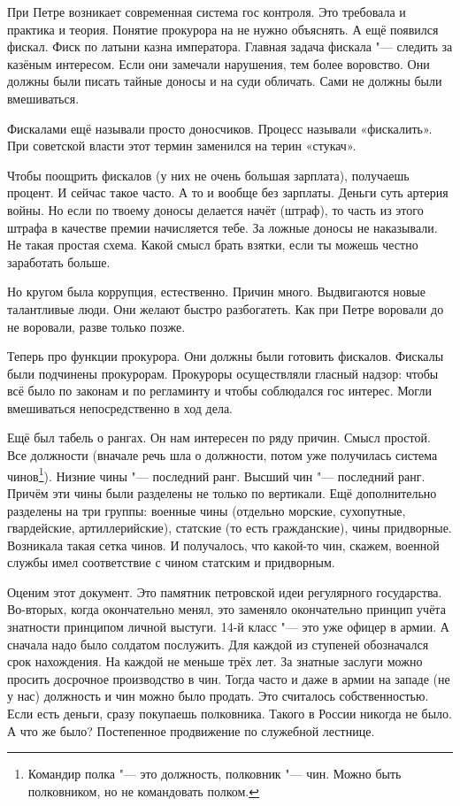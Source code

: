При Петре возникает современная система гос контроля. Это требовала и практика и теория. Понятие прокурора на не нужно объяснять. А ещё появился фискал. Фиск по латыни казна императора. Главная задача фискала "--- следить за казёным интересом. Если они замечали нарушения, тем более воровство. Они должны были писать тайные доносы и на суди обличать. Сами не должны были вмешиваться. 

Фискалами ещё называли просто доносчиков. Процесс называли «фискалить». При советской власти этот термин заменился на терин «стукач».

Чтобы поощрить фискалов (у них не очень большая зарплата), получаешь процент. И сейчас такое часто. А то и вообще без зарплаты. Деньги суть артерия войны. Но если по твоему доносы делается начёт (штраф), то часть из этого штрафа в качестве премии начисляется тебе. За ложные доносы не наказывали.
Не такая простая схема. Какой смысл брать взятки, если ты можешь честно заработать больше. 

Но кругом была коррупция, естественно. Причин много. Выдвигаются новые талантливые люди. Они желают быстро разбогатеть. Как при Петре воровали до не воровали, разве только позже.

Теперь про функции прокурора. Они должны были готовить фискалов. Фискалы были подчинены прокурорам. Прокуроры осуществляли гласный надзор: чтобы всё было по законам и по регламинту и чтобы соблюдался гос интерес. Могли вмешиваться непосредственно в ход дела. 

Ещё был табель о рангах. Он нам интересен по ряду причин. Смысл простой. Все должности (вначале речь шла о должности, потом уже получилась система чинов\footnote{Командир полка "--- это должность, полковник "--- чин. Можно быть полковником, но не командовать полком.}). Низние чины "--- последний ранг. Высший чин "--- последний ранг.
Причём эти чины были разделены не только по вертикали. Ещё дополнительно разделены на три группы: военные чины (отдельно морские, сухопутные, гвардейские, артиллерийские), статские (то есть гражданские), чины придворные. Возникала такая сетка чинов. И получалось, что какой-то чин, скажем, военной службы имел соответствие с чином статским и придворным.

Оценим этот документ. Это памятник петровской идеи регулярного государства. Во-вторых, когда окончательно менял, это заменяло окончательно принцип учёта знатности принципом личной выстуги. 14-й класс "--- это уже офицер в армии. А сначала надо было солдатом послужить.
Для каждой из ступеней обозначался срок нахождения. На каждой не меньше трёх лет. За знатные заслуги можно просить досрочное производство в чин.
Тогда часто и даже в армии на западе (не у нас) должность и чин можно было продать. Это считалось собственностью. Если есть деньги, сразу покупаешь полковника. Такого в России никогда не было. А что же было?
Постепенное продвижение по служебной лестнице.

